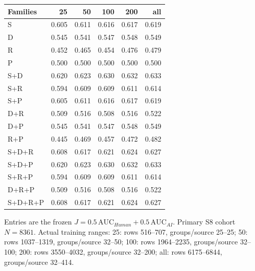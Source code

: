 \begin{tabular}{lrrrrr}
\toprule
Families & 25 & 50 & 100 & 200 & all \\
\midrule
S & 0.605 & 0.611 & 0.616 & 0.617 & 0.619 \\
D & 0.545 & 0.541 & 0.547 & 0.548 & 0.549 \\
R & 0.452 & 0.465 & 0.454 & 0.476 & 0.479 \\
P & 0.500 & 0.500 & 0.500 & 0.500 & 0.500 \\
S+D & 0.620 & 0.623 & 0.630 & 0.632 & 0.633 \\
S+R & 0.594 & 0.609 & 0.609 & 0.611 & 0.614 \\
S+P & 0.605 & 0.611 & 0.616 & 0.617 & 0.619 \\
D+R & 0.509 & 0.516 & 0.508 & 0.516 & 0.522 \\
D+P & 0.545 & 0.541 & 0.547 & 0.548 & 0.549 \\
R+P & 0.445 & 0.469 & 0.457 & 0.472 & 0.482 \\
S+D+R & 0.608 & 0.617 & 0.621 & 0.624 & 0.627 \\
S+D+P & 0.620 & 0.623 & 0.630 & 0.632 & 0.633 \\
S+R+P & 0.594 & 0.609 & 0.609 & 0.611 & 0.614 \\
D+R+P & 0.509 & 0.516 & 0.508 & 0.516 & 0.522 \\
S+D+R+P & 0.608 & 0.617 & 0.621 & 0.624 & 0.627 \\
\bottomrule
\end{tabular}
\par\smallskip
{\footnotesize Entries are the frozen $J=0.5\,\mathrm{AUC}_{Human}+0.5\,\mathrm{AUC}_{AI}$. Primary S8 cohort $N=8361$. Actual training ranges: 25: rows 516--707, groups/source 25--25; 50: rows 1037--1319, groups/source 32--50; 100: rows 1964--2235, groups/source 32--100; 200: rows 3550--4032, groups/source 32--200; all: rows 6175--6844, groups/source 32--414.}

